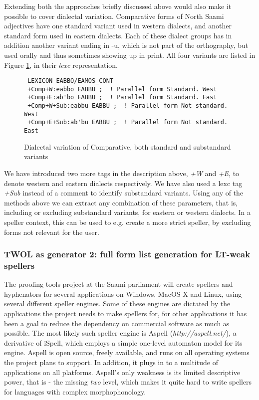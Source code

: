\documentclass[a4paper,english]{article}
\begin{document}
Extending both the approaches briefly discussed above would also make it possible to cover dialectal variation. Comparative forms of North Saami adjectives have one standard variant used in western dialects, and another standard form used in eastern dialects. Each of these dialect groups has in addition another variant ending in -u, which is not part of the orthography, but used orally and thus sometimes showing up in print. All four variants are listed in Figure \ref{dialect}, in their \textit{lexc} representation.

\begin{figure}[htbp]
\begin{center}
\begin{verbatim}
 LEXICON EABBO/EAMOS_CONT
 +Comp+W:eabbo EABBU ;  ! Parallel form Standard. West
 +Comp+E:ab'bo EABBU ;  ! Parallel form Standard. East
 +Comp+W+Sub:eabbu EABBU ;  ! Parallel form Not standard. West
 +Comp+E+Sub:ab'bu EABBU ;  ! Parallel form Not standard. East
\end{verbatim}
\caption{Dialectal variation of Comparative, both standard and substandard variants}
\label{dialect}
\end{center}
\end{figure}

We have introduced two more tags in the description above, \textit{+W} and \textit{+E}, to denote western and eastern dialects respectively. We have also used a lexc tag \textit{+Sub} instead of a comment to identify substandard variants. Using any of the methods above we can extract any combination of these parameters, that is, including or excluding substandard variants, for eastern or western dialects. In a speller context, this can be used to e.g. create a more strict speller, by excluding forms not relevant for the user.

\subsubsection{TWOL as generator 2: full form list generation for LT-weak spellers}\label{aspell}

The proofing tools project at the Saami parliament will create spellers and hyphenators for several applications on Windows, MacOS X and Linux, using several different speller engines. Some of these engines are dictated by the applications the project needs to make spellers for, for other applications it has been a goal to reduce the dependency on commercial software as much as possible. The most likely such speller engine is Aspell (\textit{http://aspell.net/}), a derivative of iSpell, which employs a simple one-level automaton model for its engine. Aspell is open source, freely available, and runs on all operating systems the project plans to support. In addition, it plugs in to a multitude of applications on all platforms. Aspell's only weakness is its limited descriptive power, that is - the missing \textit{two} level, which makes it quite hard to write spellers for languages with complex morphophonology.
\end{document}
